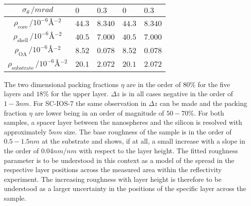 \documentclass[\main/dresen_thesis.tex]{subfiles}
\begin{document}
\begin{table}[!htbp]
\begin{tabular}{ c | l | l | l | l}
       $\sigma_\theta \, / \unit{mrad}$                             & $0$       & $0.3$     & $0$       & $0.3$ \\
       \hline
       $\rho_\mathrm{core}\, / \unit{10^{-6} \angstrom^{-2}}      $   & $44.3$  & $8.340$ & $44.3$ & $8.340$\\
       $\rho_\mathrm{shell}\, / \unit{10^{-6} \angstrom^{-2}}      $  & $40.5$  & $7.000$ & $40.5$ & $7.000$\\
       $\rho_\mathrm{OA}\, / \unit{10^{-6} \angstrom^{-2}}     $      & $8.52$  & $0.078$ & $8.52$ & $0.078$\\
       $\rho_\mathrm{substrate}\, / \unit{10^{-6} \angstrom^{-2}} $   & $20.1$  & $2.072$ & $20.1$ & $2.072$\\
      \hline
    \end{tabular}
  \end{table}
  The two dimensional packing fractions $\eta$ are in the order of $80 \unit{\%}$ for the five layers and $18 \unit{\%}$ for the upper layer.
  $\Delta z$ is in all cases negative in the order of $1 - 3 \unit{nm}$.
  For SC-IOS-7 the same observation in $\Delta z$ can be made and the packing fraction $\eta$ are lower being in an order of magnitude of $50 - 70 \unit{\%}$.
  For both samples, a spacer layer between the nanospheres and the silicon is resolved with approximately $5 \unit{nm}$ size.
  The base roughness of the sample is in the order of $0.5 - 1.5 \unit{nm}$ at the substrate and shows, if at all, a small increase with a slope in the order of $0.04 \unit{nm / nm}$ with respect to the layer height.
  The fitted roughness parameter is to be understood in this context as a model of the spread in the respective layer positions across the measured area within the reflectivity experiment.
  The increasing roughness with layer height is therefore to be understood as a larger uncertainty in the positions of the specific layer across the sample.
\end{document}
